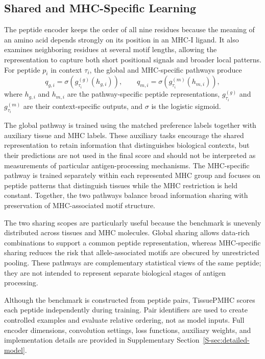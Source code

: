 \subsection{Shared and MHC-Specific Learning}

The peptide encoder keeps the order of all nine residues because the meaning of an amino acid depends strongly on its position in an MHC-I ligand. It also examines neighboring residues at several motif lengths, allowing the representation to capture both short positional signals and broader local patterns. For peptide \(p_i\) in context \(\tau_i\), the global and MHC-specific pathways produce
\[
q_{g,i}=\sigma\!\left(g^{(g)}_{\tau_i}(h_{g,i})\right),
\qquad
q_{m,i}=\sigma\!\left(g^{(m)}_{\tau_i}(h_{m,i})\right),
\]
where \(h_{g,i}\) and \(h_{m,i}\) are the pathway-specific peptide representations, \(g^{(g)}_{\tau_i}\) and \(g^{(m)}_{\tau_i}\) are their context-specific outputs, and \(\sigma\) is the logistic sigmoid.

The global pathway is trained using the matched preference labels together with auxiliary tissue and MHC labels. These auxiliary tasks encourage the shared representation to retain information that distinguishes biological contexts, but their predictions are not used in the final score and should not be interpreted as measurements of particular antigen-processing mechanisms. The MHC-specific pathway is trained separately within each represented MHC group and focuses on peptide patterns that distinguish tissues while the MHC restriction is held constant. Together, the two pathways balance broad information sharing with preservation of MHC-associated motif structure.

The two sharing scopes are particularly useful because the benchmark is unevenly distributed across tissues and MHC molecules. Global sharing allows data-rich combinations to support a common peptide representation, whereas MHC-specific sharing reduces the risk that allele-associated motifs are obscured by unrestricted pooling. These pathways are complementary statistical views of the same peptide; they are not intended to represent separate biological stages of antigen processing.

Although the benchmark is constructed from peptide pairs, TissuePMHC scores each peptide independently during training. Pair identifiers are used to create controlled examples and evaluate relative ordering, not as model inputs. Full encoder dimensions, convolution settings, loss functions, auxiliary weights, and implementation details are provided in Supplementary Section~\ref{S-sec:detailed-model}.

